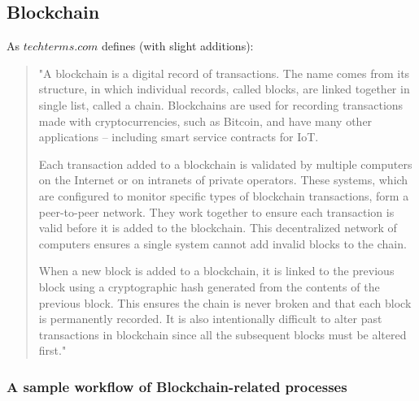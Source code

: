 \documentclass[a4paper]{article}
\begin{document}
\subsection{Blockchain}
As $techterms.com$ \cite{techterms} defines (with slight additions):
\begin{quote}
    "A blockchain is a digital record of transactions. The name comes from its structure, in which individual records, called blocks, are linked together in single list, called a chain. Blockchains are used for recording transactions made with cryptocurrencies, such as Bitcoin, and have many other applications -- including smart service contracts for IoT.
    
    Each transaction added to a blockchain is validated by multiple computers on the Internet or on intranets of private operators. These systems, which are configured to monitor specific types of blockchain transactions, form a peer-to-peer network. They work together to ensure each transaction is valid before it is added to the blockchain. This decentralized network of computers ensures a single system cannot add invalid blocks to the chain.
    
    When a new block is added to a blockchain, it is linked to the previous block using a cryptographic hash generated from the contents of the previous block. This ensures the chain is never broken and that each block is permanently recorded. It is also intentionally difficult to alter past transactions in blockchain since all the subsequent blocks must be altered first."
\end{quote}

\subsubsection{A sample workflow of Blockchain-related processes}
\end{document}
